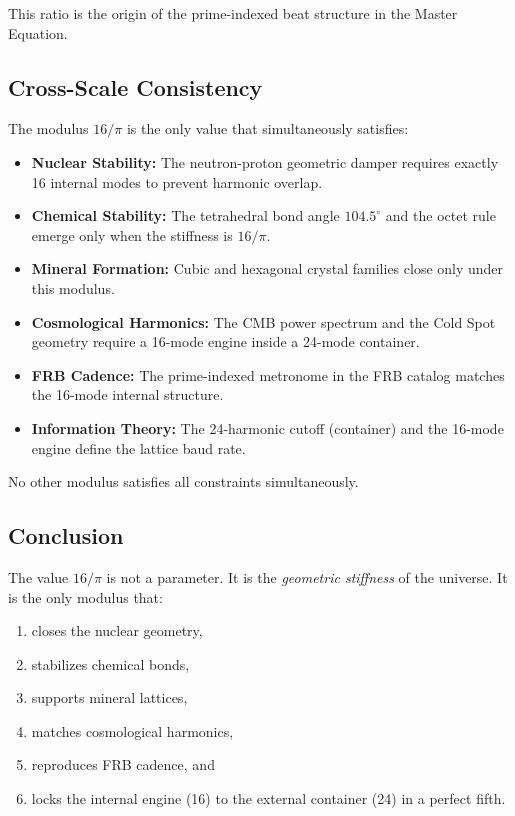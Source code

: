 \documentclass[12pt,oneside]{book}
\begin{document}
This ratio is the origin of the prime-indexed beat structure in the Master Equation.

\subsection{Cross-Scale Consistency}

The modulus \(16/\pi\) is the only value that simultaneously satisfies:

\begin{itemize}
    \item \textbf{Nuclear Stability:}  
    The neutron-proton geometric damper requires exactly 16 internal modes to
    prevent harmonic overlap.

    \item \textbf{Chemical Stability:}  
    The tetrahedral bond angle \(104.5^\circ\) and the octet rule emerge only when
    the stiffness is \(16/\pi\).

    \item \textbf{Mineral Formation:}  
    Cubic and hexagonal crystal families close only under this modulus.

    \item \textbf{Cosmological Harmonics:}  
    The CMB power spectrum and the Cold Spot geometry require a 16-mode engine
    inside a 24-mode container.

    \item \textbf{FRB Cadence:}  
    The prime-indexed metronome in the FRB catalog matches the 16-mode internal
    structure.

    \item \textbf{Information Theory:}  
    The 24-harmonic cutoff (container) and the 16-mode engine define the lattice
    baud rate.
\end{itemize}

No other modulus satisfies all constraints simultaneously.

\subsection{Conclusion}

The value \(16/\pi\) is not a parameter. It is the \emph{geometric stiffness} of the
universe. It is the only modulus that:

\begin{enumerate}
    \item closes the nuclear geometry,  
    \item stabilizes chemical bonds,  
    \item supports mineral lattices,  
    \item matches cosmological harmonics,  
    \item reproduces FRB cadence, and  
    \item locks the internal engine (16) to the external container (24) in a perfect
    fifth.
\end{enumerate}
\end{document}
